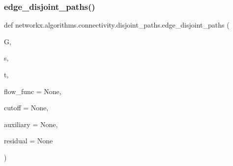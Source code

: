 \subsubsection{\texorpdfstring{edge\+\_\+disjoint\+\_\+paths()}{edge\_disjoint\_paths()}}
{\footnotesize\ttfamily def networkx.\+algorithms.\+connectivity.\+disjoint\+\_\+paths.\+edge\+\_\+disjoint\+\_\+paths (\begin{DoxyParamCaption}\item[{}]{G,  }\item[{}]{s,  }\item[{}]{t,  }\item[{}]{flow\+\_\+func = {\ttfamily None},  }\item[{}]{cutoff = {\ttfamily None},  }\item[{}]{auxiliary = {\ttfamily None},  }\item[{}]{residual = {\ttfamily None} }\end{DoxyParamCaption})}

